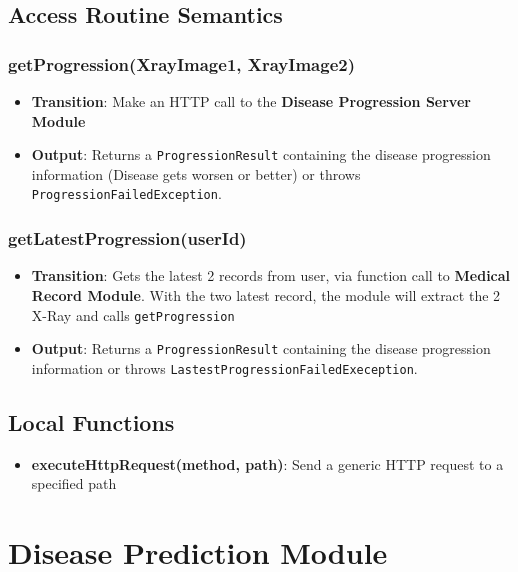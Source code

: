 \documentclass[12pt, titlepage]{article}
\begin{document}
\subsection{Access Routine Semantics}

\subsubsection{getProgression(XrayImage1, XrayImage2)}
\begin{itemize}
    \item \textbf{Transition}: Make an HTTP call to the \textbf{Disease Progression Server Module}
    \item \textbf{Output}: Returns a \texttt{ProgressionResult} containing the disease progression information (Disease gets worsen or better) or throws \texttt{ProgressionFailedException}.
\end{itemize}

\subsubsection{getLatestProgression(userId)}
\begin{itemize}
    \item \textbf{Transition}: Gets the latest 2 records from user, via function call to \textbf{Medical Record Module}. With the two latest record, the module will extract the 2 X-Ray and calls \texttt{getProgression}
    \item \textbf{Output}: Returns a \texttt{ProgressionResult} containing the disease progression information or throws \texttt{LastestProgressionFailedExeception}.
\end{itemize}

\subsection{Local Functions}
\begin{itemize}
  \item \textbf{executeHttpRequest(method, path)}: Send a generic HTTP request to a specified path
\end{itemize}

\newpage
\section{Disease Prediction Module}
\label{Disease Prediction Module}
\end{document}
